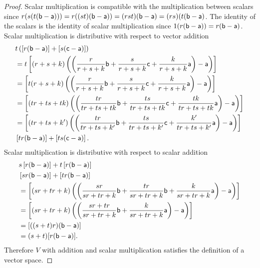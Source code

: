 \begin{mathSection}
	\begin{proof}
		Scalar multiplication is compatible with the multiplication between scalars since $r(s(t(\ens[b] - \ens[a])))= r((st)(\ens[b]-\ens[a])) = (rst)(\ens[b]-\ens[a]) = (rs)(t(\ens[b]-\ens[a])$. The identity of the scalars is the identity of scalar multiplication since $1(r(\ens[b]-\ens[a])) = r(\ens[b] - \ens[a])$. Scalar multiplication is distributive with respect to vector addition
		\begin{equation}
			\begin{aligned}
				&t\left(\left[r(\ens[b] - \ens[a])\right] + \left[s(\ens[c] - \ens[a])\right]\right) \\
				&= t\left[(r+s+k) \left(\left(\frac{r}{r+s+k}\ens[b] + \frac{s}{r+s+k} \ens[c] +\frac{k}{r+s+k} \ens[a] \right) - \ens[a]\right)\right] \\
				&= \left[t(r+s+k) \left(\left(\frac{r}{r+s+k}\ens[b] + \frac{s}{r+s+k} \ens[c] +\frac{k}{r+s+k} \ens[a] \right) - \ens[a]\right)\right] \\
				&= \left[(tr+ts+tk) \left(\left(\frac{tr}{tr+ts+tk}\ens[b] + \frac{ts}{tr+ts+tk} \ens[c] +\frac{tk}{tr+ts+tk} \ens[a] \right) - \ens[a]\right)\right] \\
				&= \left[(tr+ts+k') \left(\left(\frac{tr}{tr+ts+k'}\ens[b] + \frac{ts}{tr+ts+k'} \ens[c] +\frac{k'}{tr+ts+k'} \ens[a] \right) - \ens[a]\right)\right] \\
				&\left[tr(\ens[b] - \ens[a])\right] + \left[ts(\ens[c] - \ens[a])\right].
			\end{aligned}
		\end{equation}
		Scalar multiplication is distributive with respect to scalar addition
		\begin{equation}
			\begin{aligned}
				&s\left[r(\ens[b] - \ens[a])\right] + t\left[r(\ens[b] - \ens[a])\right] \\
				&\left[sr(\ens[b] - \ens[a])\right] + \left[tr(\ens[b] - \ens[a])\right] \\
				&= \left[(sr+tr+k) \left(\left(\frac{sr}{sr+tr+k}\ens[b] + \frac{tr}{sr+tr+k} \ens[b] +\frac{k}{sr+tr+k} \ens[a] \right) - \ens[a]\right)\right] \\
				&= \left[(sr+tr+k) \left(\left(\frac{sr+tr}{sr+tr+k}\ens[b] + \frac{k}{sr+tr+k} \ens[a] \right) - \ens[a]\right)\right] \\
				&= [((s+t)r)(\ens[b]-\ens[a])] \\
				&= (s+t)[r(\ens[b]-\ens[a])].
			\end{aligned}
		\end{equation}
		Therefore $V$ with addition and scalar multiplication satisfies the definition of a vector space.
	\end{proof}
	

\end{mathSection}
